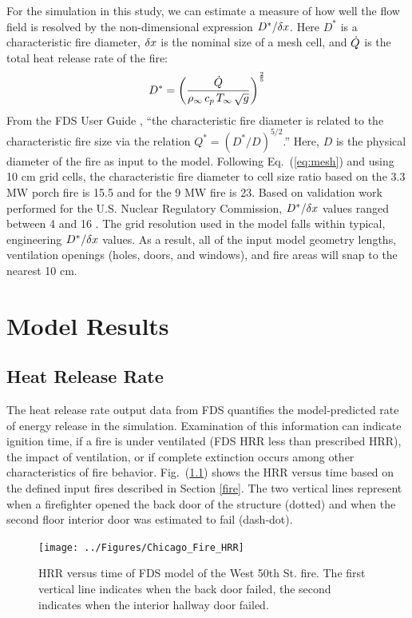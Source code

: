 \documentclass[11pt,oneside]{book}
\begin{document}
For the simulation in this study, we can estimate a measure of how well the flow field is resolved by the non-dimensional expression $D^*/\delta x$. Here $D^*$ is a characteristic fire diameter, $\delta x$ is the nominal size of a mesh cell, and $\dot{Q}$ is the total heat release rate of the fire:
\begin{equation}
D^* = \left(
     \frac{\dot{Q}}{\rho_\infty \, c_p \, T_\infty \, \sqrt{g} }
     \right)^\frac{2}{5} 
\label{eq:mesh}
\end{equation}   
From the FDS User Guide \cite{FDS_Users_Guide}, ``the characteristic fire diameter is related to the characteristic fire size via the
relation $Q^* = (D^*/D)^{5/2}$.'' Here, $D$ is the physical diameter of the fire as input to the model. Following Eq.~(\ref{eq:mesh}) and using 10 cm grid cells, the characteristic fire diameter to cell size ratio based on the 3.3 MW porch fire is 15.5 and for the 9 MW fire is 23. Based on validation work performed for the U.S. Nuclear Regulatory Commission, $D^*/\delta x$ values ranged between 4 and 16 \cite{NUREG_1824}. The grid resolution used in the model falls within typical, engineering $D^*/\delta x$ values. As a result, all of the input model geometry lengths, ventilation openings (holes, doors, and windows), and fire areas will snap to the nearest 10 cm.

\chapter{Model Results}

\section{Heat Release Rate}
\label{HRR}
The heat release rate output data from FDS quantifies the model-predicted rate of energy release in the simulation. Examination of this information can indicate ignition time, if a fire is under ventilated (FDS HRR less than prescribed HRR), the impact of ventilation, or if complete extinction occurs among other characteristics of fire behavior. Fig.~(\ref{fig:hrr}) shows the HRR versus time based on the defined input fires described in Section \ref{fire}. The two vertical lines represent when a firefighter opened the back door of the structure (dotted) and when the second floor interior door was estimated to fail (dash-dot).

\begin{figure}[h!]
\centering
\texttt{[image: ../Figures/Chicago\_Fire\_HRR]}
\caption{HRR versus time of FDS model of the West 50th St. fire. The first vertical line indicates when the back door failed, the second indicates when the interior hallway door failed.}
\label{fig:hrr}
\end{figure}
\end{document}
